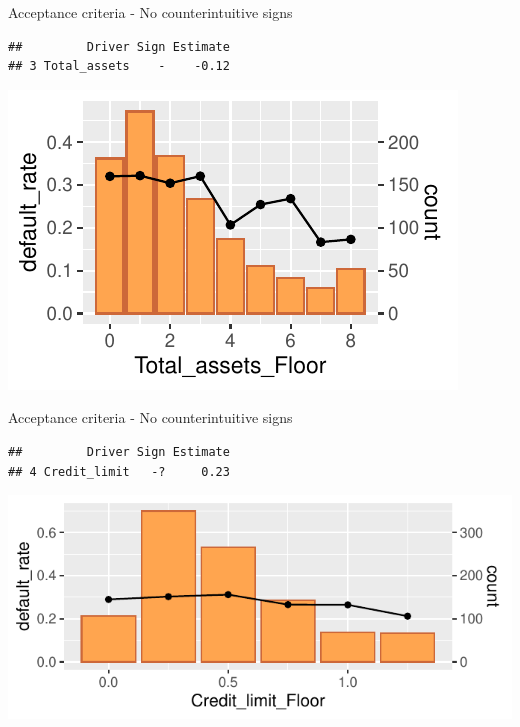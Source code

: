 \documentclass[9pt,ignorenonframetext,]{beamer}
\begin{document}
\begin{frame}[fragile]{Acceptance criteria - No counterintuitive signs}

\begin{verbatim}
##         Driver Sign Estimate
## 3 Total_assets    -    -0.12
\end{verbatim}

\includegraphics{Risk-Models-Development-Process_files/figure-beamer/unnamed-chunk-54-1.pdf}

\end{frame}

\begin{frame}[fragile]{Acceptance criteria - No counterintuitive signs}

\begin{verbatim}
##         Driver Sign Estimate
## 4 Credit_limit   -?     0.23
\end{verbatim}

\includegraphics{Risk-Models-Development-Process_files/figure-beamer/unnamed-chunk-55-1.pdf}

\end{frame}
\end{document}
